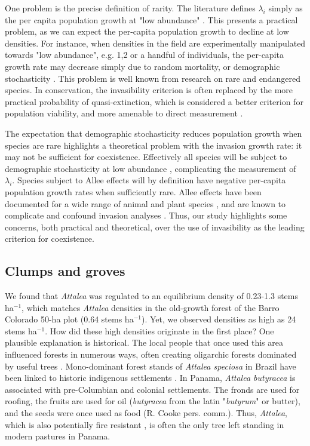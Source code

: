 \documentclass[b5paper,justified]{tufte-book} %
\begin{document}
\begin{fullwidth}
One problem is the precise definition of rarity. The literature defines $\lambda_i$ simply as the per capita population growth at "low abundance" \citep{Chesson2000, Siepielski2010}. This presents a practical problem, as we can expect the per-capita population growth to decline at low densities. For instance, when densities in the field are experimentally manipulated towards "low abundance", e.g. 1,2 or a handful of individuals, the per-capita  growth rate may decrease simply due to random mortality, or demographic stochasticity \citep{Lande1998}. This problem is well known from research on rare and endangered species. In conservation, the invasibility criterion is often replaced by the more practical probability of quasi-extinction, which is considered a better criterion for population viability, and more amenable to direct measurement \citep{Holmes2007}.

The expectation that demographic stochasticity reduces population growth when species are rare highlights a theoretical problem with the invasion growth rate: it may not be sufficient for coexistence. Effectively all species will be subject to demographic stochasticity at low abundance \citep[e.g.][]{Lande1998}, complicating the measurement of $\lambda_i$.  Species subject to Allee effects \citep[e.g.][]{Stephens1999} will by definition have negative per-capita population growth rates when sufficiently rare. Allee effects have been documented for a wide range of animal and plant species \citep{Courchamp1999}, and are known to complicate and confound invasion analyses \citep{Taylor2005}. Thus, our study highlights some concerns, both practical and theoretical, over the use of invasibility as the leading criterion for coexistence. 

\subsection{Clumps and groves}
We found that \textit{Attalea} was regulated to an equilibrium density of 0.23-1.3 stems ha$^{-1}$, which matches \textit{Attalea} densities in the old-growth forest of the Barro Colorado 50-ha plot (0.64 stems ha$^{-1}$).  Yet, we observed densities as high as 24 stems ha$^{-1}$. How did these high densities originate in the first place?  One plausible explanation is historical. The local people that once used this area influenced forests in numerous ways, often creating oligarchic forests dominated by useful trees \citep{Levis2012}.  Mono-dominant forest stands of \textit{Attalea speciosa} in Brazil have been linked to historic indigenous settlements \citep{Balee1993}. In Panama, \textit{Attalea butyracea} is associated with pre-Columbian and colonial settlements. The fronds are used for roofing, the fruits are used for oil (\textit{butyracea} from the latin "\textit{butyrum}" or butter), and the seeds were once used as food (R. Cooke pers. comm.). Thus, \textit{Attalea}, which is also potentially fire resistant \citep{Souza2004}, is often the only tree left standing in modern pastures in Panama. 


\end{fullwidth}
\end{document}
